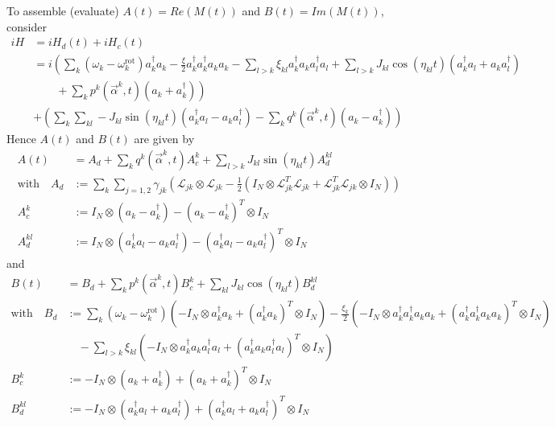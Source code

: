 \documentclass[11pt]{article}
\newcommand{\Ell}{\mathcal{L}}
\begin{document}
   To assemble (evaluate) 
   $A(t) = Re(M(t))$ and $B(t) = Im(M(t))$, consider
   \begin{align}
    iH &= iH_d(t) + iH_c(t) \\
      &= i\left( \sum_k (\omega_k - \omega_k^{\text{rot}}) a_k^\dagger a_k - \frac{\xi}{2}a_k^\dagger a_k^\dagger a_k a_k  - \sum_{l>k}  \xi_{kl} a_k^\dagger a_k a_l^\dagger a_l +  \sum_{l>k} J_{kl} \cos(\eta_{kl}t)\left(a_k^\dagger a_l + a_ka_l^\dagger \right)
       \right.\\
      & \left. \quad \quad + \sum_k p^k(\vec{\alpha}^k,t) \left(a_k + a_k^\dagger\right) \right)\\
      &+ \left( \sum_k \sum_{kl} - J_{kl} \sin(\eta_{kl}t) \left(a_k^\dagger a_l - a_ka_l^\dagger\right)  - \sum_k q^k(\vec{\alpha}^k, t)\left(a_k - a_k^\dagger\right)\right)
   \end{align}
   Hence $A(t)$ and $B(t)$ are given by 
   \begin{align}
    A(t) &= A_d + \sum_k  q^k(\vec{\alpha}^k,t) A_c^k + \sum_{l>k} J_{kl} \sin(\eta_{kl}t)  A_d^{kl} \\
   \text{with} \quad  A_d &:= \sum_k \sum_{j=1,2} \gamma_{jk} \left( \Ell_{jk}\otimes\Ell_{jk} - \frac 1 2 \left(I_N \otimes \Ell_{jk}^T\Ell_{jk} + \Ell_{jk}^T\Ell_{jk}\otimes I_N\right) \right)\\
    A_c^k &:=  I_N \otimes \left(a_k - a_k^\dagger\right) - \left(a_k - a_k^\dagger\right)^T\otimes I_N \\
    A_d^{kl} &:=  I_N\otimes \left(a_k^\dagger a_l - a_k a_l^\dagger\right) - \left(a_k^\dagger a_l - a_k a_l^\dagger\right)^T\otimes I_N 
   \end{align}
   and
   \begin{align}
     B(t) &=  B_d + \sum_k p^k(\vec{\alpha}^k,t) B_c^k + \sum_{kl} J_{kl} \cos(\eta_{kl}t)B_d^{kl}\\
     \text{with} \quad B_d &:= \sum_k (\omega_k - \omega_k^{\text{rot}}) \left(-I_N \otimes a_k^\dagger a_k + (a_k^\dagger a_k)^T \otimes I_N \right) - \frac{\xi_k}{2}\left(- I_N \otimes a_k^\dagger a_k^\dagger a_k a_k + (a_k^\dagger a_k^\dagger a_k a_k )^T\otimes I_N\right)  \\
       &\quad - \sum_{l>k}  \xi_{kl} \left(-I_N \otimes a_k^\dagger a_k a_l^\dagger a_l + (a_k^\dagger a_k a_l^\dagger a_l)^T \otimes I_N \right)\\
       B_c^k &:=  - I_N \otimes \left(a_k + a_k^\dagger\right) + \left(a_k + a_k^\dagger\right)^T\otimes I_N \\
       B_d^{kl} &:=  - I_N\otimes \left(a_k^\dagger a_l + a_k a_l^\dagger\right) + \left(a_k^\dagger a_l + a_k a_l^\dagger\right)^T\otimes I_N \\
   \end{align}
\end{document}
